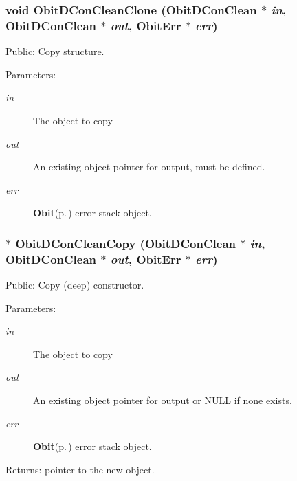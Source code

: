 \subsubsection{\setlength{\rightskip}{0pt plus 5cm}void Obit\-DCon\-Clean\-Clone ({\bf Obit\-DCon\-Clean} $\ast$ {\em in}, {\bf Obit\-DCon\-Clean} $\ast$ {\em out}, {\bf Obit\-Err} $\ast$ {\em err})}\label{ObitDConClean_8c_a15}


Public: Copy structure. 

\begin{Desc}
\item[Parameters:]
\begin{description}
\item[{\em in}]The object to copy \item[{\em out}]An existing object pointer for output, must be defined. \item[{\em err}]{\bf Obit}{\rm (p.\,\pageref{structObit})} error stack object. \end{description}
\end{Desc}
\subsubsection{$\ast$ Obit\-DCon\-Clean\-Copy ({\bf Obit\-DCon\-Clean} $\ast$ {\em in}, {\bf Obit\-DCon\-Clean} $\ast$ {\em out}, {\bf Obit\-Err} $\ast$ {\em err})}\label{ObitDConClean_8c_a14}


Public: Copy (deep) constructor. 

\begin{Desc}
\item[Parameters:]
\begin{description}
\item[{\em in}]The object to copy \item[{\em out}]An existing object pointer for output or NULL if none exists. \item[{\em err}]{\bf Obit}{\rm (p.\,\pageref{structObit})} error stack object. \end{description}
\end{Desc}
\begin{Desc}
\item[Returns:]pointer to the new object. \end{Desc}
